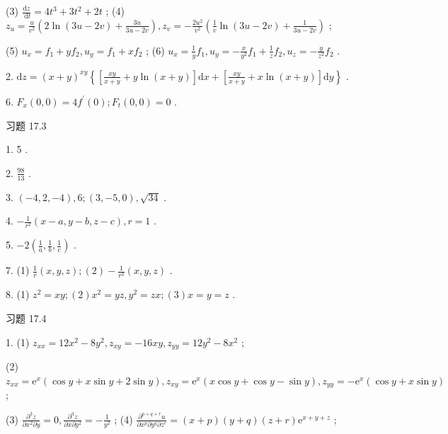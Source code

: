(3) \(\frac{\mathrm{d}z}{\mathrm{\;d}t} = 4{t}^{3} + 3{t}^{2} + {2t}\) ; (4) \({z}_{u} = \frac{u}{{v}^{2}}\left( {2\ln \left( {{3u} - {2v}}\right)  + \frac{3u}{{3u} - {2v}}}\right) ,{z}_{v} =  - \frac{2{u}^{2}}{{v}^{2}}\left( {\frac{1}{v}\ln \left( {{3u} - {2v}}\right)  + \frac{1}{{3u} - {2v}}}\right)\) ;

(5) \({u}_{x} = {f}_{1} + y{f}_{2},{u}_{y} = {f}_{1} + x{f}_{2}\) ; (6) \({u}_{x} = \frac{1}{y}{f}_{1},{u}_{y} =  - \frac{x}{{y}^{2}}{f}_{1} + \frac{1}{z}{f}_{2},{u}_{z} =  - \frac{y}{{z}^{2}}{f}_{2}\) .

2. \(\mathrm{d}z = {\left( x + y\right) }^{xy}\left\{  {\left\lbrack  {\frac{xy}{x + y} + y\ln \left( {x + y}\right) }\right\rbrack  \mathrm{d}x + \left\lbrack  {\frac{xy}{x + y} + x\ln \left( {x + y}\right) }\right\rbrack  \mathrm{d}y}\right\}\) .

6. \({F}_{x}\left( {0,0}\right)  = 4{f}^{\prime }\left( 0\right) ;{F}_{t}\left( {0,0}\right)  = 0\) .

习题 17.3

1. 5 .

2. \(\frac{98}{13}\) .

3. \(\left( {-4,2, - 4}\right) ,6;\left( {3, - 5,0}\right) ,\sqrt{34}\) .

4. \(- \frac{1}{{r}^{2}}\left( {x - a,y - b,z - c}\right) ,r = 1\) .

5. \(- 2\left( {\frac{1}{a},\frac{1}{b},\frac{1}{c}}\right)\) .

7. (1) \(\frac{1}{r}\left( {x,y,z}\right) ;\left( 2\right)  - \frac{1}{{r}^{3}}\left( {x,y,z}\right)\) .

8. (1) \({z}^{2} = {xy};\left( 2\right) {x}^{2} = {yz},{y}^{2} = {zx};\left( 3\right) x = y = z\) .

习题 17.4

1. (1) \({z}_{xx} = {12}{x}^{2} - 8{y}^{2},{z}_{xy} =  - {16xy},{z}_{yy} = {12}{y}^{2} - 8{x}^{2}\) ;


(2) \({z}_{xx} = {\mathrm{e}}^{x}\left( {\cos y + x\sin y + 2\sin y}\right) ,{z}_{xy} = {\mathrm{e}}^{x}\left( {x\cos y + \cos y - \sin y}\right) ,{z}_{yy} =  - {\mathrm{e}}^{x}\left( {\cos y + x\sin y}\right)\) ;

(3) \(\frac{{\partial }^{3}z}{\partial {x}^{2}\partial y} = 0,\frac{{\partial }^{3}z}{\partial x\partial {y}^{2}} =  - \frac{1}{{y}^{2}}\) ; (4) \(\frac{{\partial }^{p + q + r}u}{\partial {x}^{p}\partial {y}^{q}\partial {z}^{r}} = \left( {x + p}\right) \left( {y + q}\right) \left( {z + r}\right) {\mathrm{e}}^{x + y + z}\) ;

